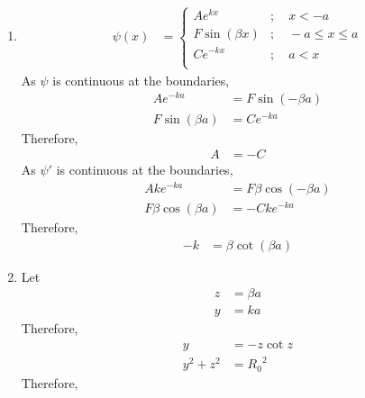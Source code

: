 \documentclass[fleqn, a4paper, 11pt, oneside]{amsart}
\theoremstyle{definition}
\theoremstyle{theorem}
\begin{document}
\begin{solution}
	\begin{enumerate}[leftmargin=*]
		\item
			\begin{align*}
				\psi(x) &=
					\begin{cases}
						A e^{k x}       & ;\quad x < -a         \\
						F \sin(\beta x) & ;\quad -a \le x \le a \\
						C e^{-k x}      & ;\quad a < x          \\
					\end{cases}
			\end{align*}
			As $\psi$ is continuous at the boundaries,
			\begin{align*}
				A e^{-k a}      & = F \sin(-\beta a) \\
				F \sin(\beta a) & = C e^{-k a}
			\end{align*}
			Therefore,
			\begin{align*}
				A & = -C
			\end{align*}
			As $\psi'$ is continuous at the boundaries,
			\begin{align*}
				A k e^{-k a}          & = F \beta \cos(-\beta a) \\
				F \beta \cos(\beta a) & = -C k e^{-k a}
			\end{align*}
			Therefore,
			\begin{align*}
				-k & = \beta \cot(\beta a)
			\end{align*}
		\item
			Let
			\begin{align*}
				z & = \beta a \\
				y & = k a
			\end{align*}
			Therefore,
			\begin{align*}
				y         & = -z \cot z \\
				y^2 + z^2 & = {R_0}^2
			\end{align*}
			Therefore,
			\begin{figure}[H]
				\centering

\end{figure}
\end{enumerate}
\end{solution}
\end{document}

